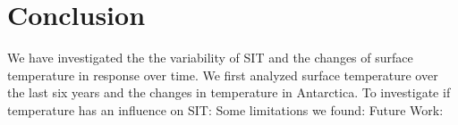 \documentclass{article}
\begin{document}
\section{Conclusion}
We have investigated the the variability of SIT and the changes of surface temperature in response over time. 
We first analyzed surface temperature over the last six years and the changes in temperature in Antarctica.\newline
To investigate if temperature has an influence on SIT: \newline
Some limitations we found: \newline
Future Work:


\end{document}
